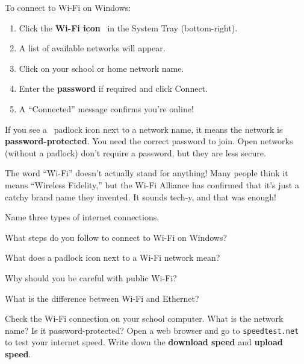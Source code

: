 To connect to Wi-Fi on Windows:
\begin{enumerate}[label=\protect\stepcircle{\arabic*}, leftmargin=2cm, itemsep=4pt]
  \item Click the \textbf{Wi-Fi icon} \faWifi\ in the System Tray (bottom-right).
  \item A list of available networks will appear.
  \item Click on your school or home network name.
  \item Enter the \textbf{password} if required and click Connect.
  \item A ``Connected'' message confirms you're online!
\end{enumerate}

\begin{notebox}
If you see a \faLock\ padlock icon next to a network name, it means the network is \textbf{password-protected}. You need the correct password to join. Open networks (without a padlock) don't require a password, but they are less secure.
\end{notebox}


\begin{funfact}
The word ``Wi-Fi'' doesn't actually stand for anything! Many people think it means ``Wireless Fidelity,'' but the Wi-Fi Alliance has confirmed that it's just a catchy brand name they invented. It sounds tech-y, and that was enough!
\end{funfact}

\begin{reviewqs}
  \item Name three types of internet connections.
  \item What steps do you follow to connect to Wi-Fi on Windows?
  \item What does a padlock icon next to a Wi-Fi network mean?
  \item Why should you be careful with public Wi-Fi?
  \item What is the difference between Wi-Fi and Ethernet?
\end{reviewqs}

\begin{challenge}
Check the Wi-Fi connection on your school computer. What is the network name? Is it password-protected? Open a web browser and go to \texttt{speedtest.net} to test your internet speed. Write down the \textbf{download speed} and \textbf{upload speed}.\end{challenge}
